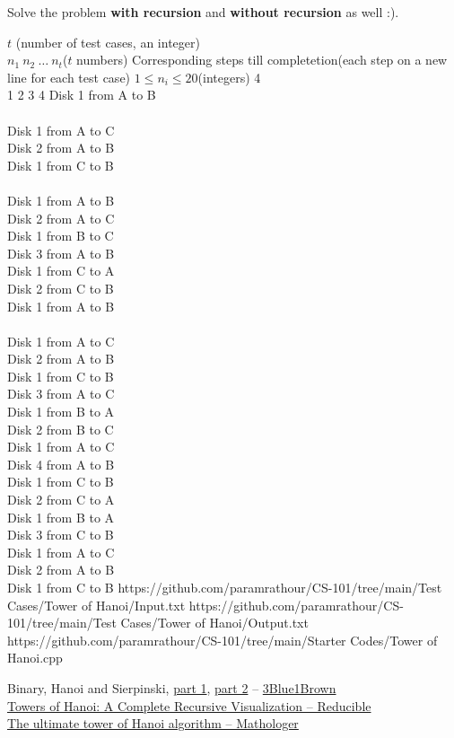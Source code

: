 Solve the problem \textbf{with recursion} and \textbf{without recursion} as well :).
\begin{testcasesMore}
	{$t$ \hfill(number of test cases, an integer)\\$n_1\ n_2\ \ldots \ n_t$\hfill($t$ numbers)}
	{Corresponding steps till completetion\hfill(each step on a new line for each test case)}
	{$1\leq n_i \leq 20$\hfill(integers)}
	{4\\1 2 3 4}
	{Disk 1 from A to B\\\\
	Disk 1 from A to C\\
	Disk 2 from A to B\\
	Disk 1 from C to B\\\\
	Disk 1 from A to B\\
	Disk 2 from A to C\\
	Disk 1 from B to C\\
	Disk 3 from A to B\\
	Disk 1 from C to A\\
	Disk 2 from C to B\\
	Disk 1 from A to B\\\\
	Disk 1 from A to C\\
	Disk 2 from A to B\\
	Disk 1 from C to B\\
	Disk 3 from A to C\\
	Disk 1 from B to A\\
	Disk 2 from B to C\\
	Disk 1 from A to C\\
	Disk 4 from A to B\\
	Disk 1 from C to B\\
	Disk 2 from C to A\\
	Disk 1 from B to A\\
	Disk 3 from C to B\\
	Disk 1 from A to C\\
	Disk 2 from A to B\\
	Disk 1 from C to B}
	{https://github.com/paramrathour/CS-101/tree/main/Test Cases/Tower of Hanoi/Input.txt}
	{https://github.com/paramrathour/CS-101/tree/main/Test Cases/Tower of Hanoi/Output.txt}
	{https://github.com/paramrathour/CS-101/tree/main/Starter Codes/Tower of Hanoi.cpp}
\end{testcasesMore}
\begin{funvideo}
	Binary, Hanoi and Sierpinski, \href{https://youtu.be/2SUvWfNJSsM}{part 1}, \href{https://youtu.be/bdMfjfT0lKk}{part 2} -- \href{https://www.youtube.com/@3blue1brown}{3Blue1Brown}\\
	\href{https://youtu.be/rf6uf3jNjbo}{Towers of Hanoi: A Complete Recursive Visualization -- Reducible}\\
	\href{https://youtu.be/MbonokcLbNo}{The ultimate tower of Hanoi algorithm -- Mathologer}
\end{funvideo}
\recalctypearea
{}
\recalctypearea

